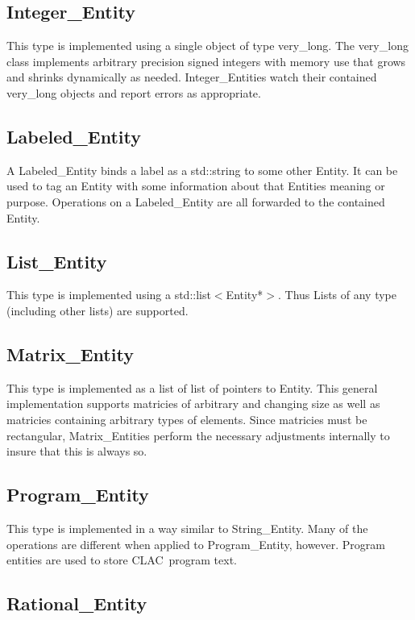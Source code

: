 \documentclass{report}
\newcommand{\CLAC}{CLAC}
\begin{document}
\subsection{Integer\_Entity}

This type is implemented using a single object of type very\_long. The very\_long class implements arbitrary precision signed integers with memory use that grows and shrinks dynamically as needed. Integer\_Entities watch their contained very\_long objects and report errors as appropriate.

\subsection{Labeled\_Entity}

A Labeled\_Entity binds a label as a std::string to some other Entity. It can be used to tag an Entity with some information about that Entities meaning or purpose. Operations on a Labeled\_Entity are all forwarded to the contained Entity.

\subsection{List\_Entity}

This type is implemented using a std::list$<$Entity*$>$. Thus Lists of any type (including other lists) are supported.

\subsection{Matrix\_Entity}

This type is implemented as a list of list of pointers to Entity. This general implementation supports matricies of arbitrary and changing size as well as matricies containing arbitrary types of elements. Since matricies must be rectangular, Matrix\_Entities perform the necessary adjustments internally to insure that this is always so.

\subsection{Program\_Entity}

This type is implemented in a way similar to String\_Entity. Many of the operations are different when applied to Program\_Entity, however. Program entities are used to store \CLAC\ program text.

\subsection{Rational\_Entity}
\end{document}
